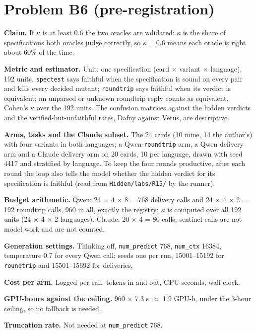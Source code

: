 \documentclass[11pt]{article}
\begin{document}
\section*{Problem B6 (pre-registration)}\label{ans:B6}
\begin{answer}
\textbf{Claim.} If $\kappa$ is at least 0.6 the two oracles are validated:
$\kappa$ is the share of specifications both oracles judge correctly, so
$\kappa = 0.6$ means each oracle is right about 60\% of the time.

\textbf{Metric and estimator.} Unit: one specification (card $\times$ variant
$\times$ language), 192 units. \texttt{spectest} says faithful when the
specification is sound on every pair and kills every decided mutant;
\texttt{roundtrip} says faithful when its verdict is equivalent; an unparsed or
unknown roundtrip reply counts as equivalent. Cohen's $\kappa$ over the 192
units. The confusion matrices against the hidden verdicts and the
verified-but-unfaithful rates, Dafny against Verus, are descriptive.

\textbf{Arms, tasks and the Claude subset.} The 24 cards (10 mine, 14 the
author's) with four variants in both languages; a Qwen \texttt{roundtrip} arm,
a Qwen delivery arm and a Claude delivery arm on 20 cards, 10 per language,
drawn with seed 4417 and stratified by language. To
keep the four rounds productive, after each round the loop also tells the model
whether the hidden verdict for its specification is faithful (read from
\texttt{Hidden/labs/R15/} by the runner).

\textbf{Budget arithmetic.} Qwen: 24 $\times$ 4 $\times$ 8 = 768 delivery
calls and 24 $\times$ 4 $\times$ 2 = 192 roundtrip calls, 960 in all, exactly
the registry; $\kappa$ is computed over all 192 units (24 $\times$ 4 $\times$ 2
languages). Claude: 20 $\times$ 4 = 80 calls; sentinel calls are not model work
and are not counted.

\textbf{Generation settings.} Thinking off, \texttt{num\_predict} 768,
\texttt{num\_ctx} 16384, temperature 0.7 for every Qwen call; seeds one per
run, 15001--15192 for \texttt{roundtrip} and 15501--15692 for deliveries.

\textbf{Cost per arm.} Logged per call: tokens in and out, GPU-seconds, wall
clock.

\textbf{GPU-hours against the ceiling.} 960 $\times$ 7.3 s $\approx$ 1.9
GPU-h, under the 3-hour ceiling, so no fallback is needed.

\textbf{Truncation rate.} Not needed at \texttt{num\_predict} 768.


\end{answer}
\end{document}

